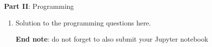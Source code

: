 \documentclass{article}
\begin{document}
\large{\textbf{Part II}: Programming}\normalsize

\begin{enumerate}[leftmargin=\labelsep]
\item Solution to the programming questions here.

\vskip 1cm
\textbf{End note}: do not forget to also submit your Jupyter notebook

\newpage

\end{enumerate}

\end{document}

